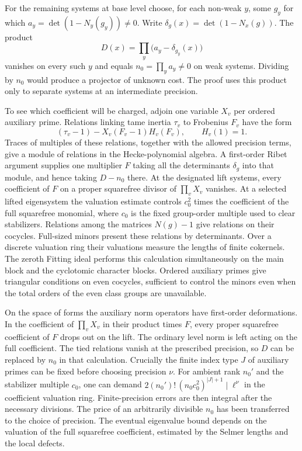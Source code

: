 For the remaining systems at base level choose, for each non-weak $y$, some $g_y$ for which $a_y=\det(1-N_y(g_y))\ne0$. Write $\delta_g(x)=\det(1-N_x(g))$. The product
\[
 D(x)=\prod_y\bigl(a_y-\delta_{g_y}(x)\bigr)
\]
vanishes on every such $y$ and equals $n_0=\prod_y a_y\ne0$ on weak systems. Dividing by $n_0$ would produce a projector of unknown cost. The proof uses this product only to separate systems at an intermediate precision.

To see which coefficient will be charged, adjoin one variable $X_v$ per ordered auxiliary prime. Relations linking tame inertia $\tau_v$ to Frobenius $F_v$ have the form
\[
       (\tau_v-1)-X_v(F_v-1)H_v(F_v),\qquad H_v(1)=1 .
\]
Traces of multiples of these relations, together with the allowed precision terms, give a module of relations in the Hecke-polynomial algebra. A first-order Ribet argument supplies one multiplier $F$ taking all the determinants $\delta_g$ into that module, and hence taking $D-n_0$ there. At the designated lift systems, every coefficient of $F$ on a proper squarefree divisor of $\prod_v X_v$ vanishes. At a selected lifted eigensystem the valuation estimate controls \(c_0^2\) times the coefficient of the full squarefree monomial, where \(c_0\) is the fixed group-order multiple used to clear stabilizers. Relations among the matrices $N(g)-1$ give relations on their cocycles. Full-sized minors present these relations by determinants. Over a discrete valuation ring their valuations measure the lengths of finite cokernels. The zeroth Fitting ideal performs this calculation simultaneously on the main block and the cyclotomic character blocks. Ordered auxiliary primes give triangular conditions on even cocycles, sufficient to control the minors even when the total orders of the even class groups are unavailable.

On the space of forms the auxiliary norm operators have first-order deformations. In the coefficient of $\prod_v X_v$ in their product times $F$, every proper squarefree coefficient of $F$ drops out on the lift. The ordinary level norm is left acting on the full coefficient. The tied relations vanish at the prescribed precision, so $D$ can be replaced by $n_0$ in that calculation. Crucially the finite index type $J$ of auxiliary primes can be fixed before choosing precision $\nu$. For ambient rank $n_0'$ and the stabilizer multiple $c_0$, one can demand $2(n_0')!\,(n_0c_0^2)^{|J|+1}\mid\ell^\nu$ in the coefficient valuation ring. Finite-precision errors are then integral after the necessary divisions. The price of an arbitrarily divisible $n_0$ has been transferred to the choice of precision. The eventual eigenvalue bound depends on the valuation of the full squarefree coefficient, estimated by the Selmer lengths and the local defects.

